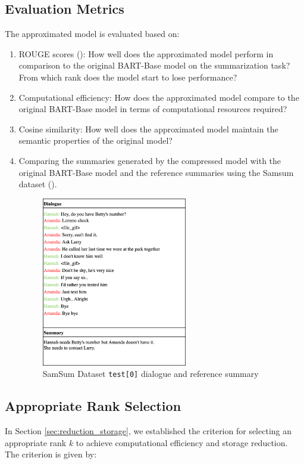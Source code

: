         
        
    \subsection{Evaluation Metrics}
        The approximated model is evaluated based on:
        \begin{enumerate}
        \item ROUGE scores (\cite{lin-2004-rouge}): How well does the approximated model perform in comparison to the original BART-Base model on the summarization task? From which rank does the model start to lose performance?
        \item Computational efficiency: How does the approximated model compare to the original BART-Base model in terms of computational resources required?
        \item Cosine similarity: How well does the approximated model maintain the semantic properties of the original model?
        \item Comparing the summaries generated by the compressed model with the original BART-Base model and the reference summaries using the Samsum dataset (\cite{gliwa-etal-2019-samsum}).
        \begin{figure}[H]
            \centering
            \includegraphics[width=0.6\textwidth]{figs/dialogue.png}
            \caption{SamSum Dataset \texttt{test[0]} dialogue and reference summary}
            \label{fig:SamSum_Example}
        \end{figure}
        \end{enumerate}

        \subsection{Appropriate Rank Selection}
            In Section \ref{sec:reduction_storage}, we established the criterion for selecting an appropriate rank \(k\) to achieve computational efficiency and storage reduction. The criterion is given by:
            
